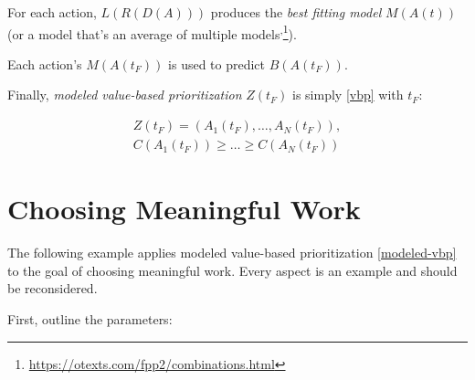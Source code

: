 \documentclass[10pt, a4paper, twocolumn]{IEEEconf}
\begin{document}
For each action, $L(R(D(A)))$ produces the \textit{best fitting model} $M(A(t))$ (or a model that's an average of multiple models\cite{clemen1989combining}\textsuperscript{,}\footnote{\scriptsize{\url{https://otexts.com/fpp2/combinations.html}}}).

Each action's $M(A(t_F))$ is used to predict $B(A(t_F))$.

Finally, \textit{modeled value-based prioritization} $Z(t_F)$ is simply \eqref{vbp} with $t_F$:

\begin{equation}\label{modeled-vbp}
  \begin{gathered}
    Z(t_F) = (A_1(t_F), \ldots, A_N(t_F)), \\
    C(A_1(t_F)) \geq \ldots \geq C(A_N(t_F))
  \end{gathered}
\end{equation}

\section{Choosing Meaningful Work}\label{section-example}

The following example applies modeled value-based prioritization \eqref{modeled-vbp} to the goal of choosing meaningful work.
Every aspect is an example and should be reconsidered.

First, outline the parameters:
\end{document}
